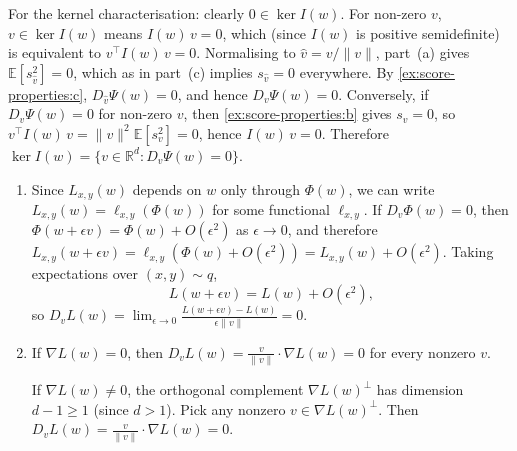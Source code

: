 \documentclass[11pt]{article}
\newcommand{\R}{\mathbb{R}}
\newcommand{\E}{\mathbb{E}}
\begin{document}
\begin{solution}
\begin{enumerate}
        For the kernel characterisation: clearly $0 \in \ker I(w)$.
        For non-zero $v$, $v \in \ker I(w)$ means $I(w)\,v = 0$, which
        (since $I(w)$ is positive semidefinite) is equivalent to
        $v^\top I(w)\, v = 0$. Normalising to $\hat{v} = v/\|v\|$,
        part~(a) gives $\E[s_{\hat{v}}^2] = 0$, which as in part~(c)
        implies $s_{\hat{v}} = 0$ everywhere. By
        \cref{ex:score-properties:c}, $D_{\hat{v}} \Psi(w) = 0$, and
        hence $D_v \Psi(w) = 0$. Conversely, if $D_v \Psi(w) = 0$ for
        non-zero $v$, then \cref{ex:score-properties:b} gives $s_v = 0$,
        so $v^\top I(w)\, v = \|v\|^2 \E[s_v^2] = 0$, hence
        $I(w)\, v = 0$. Therefore
        $\ker I(w)
        = \{v \in \R^d : D_v \Psi(w) = 0\}$. \qedhere
\end{enumerate}
\end{solution}

\begin{solution}
\begin{enumerate}
    \item
        Since $L_{x,y}(w)$ depends on $w$ only through $\Phi(w)$, we can write
        $L_{x,y}(w) = \ell_{x,y}(\Phi(w))$ for some functional $\ell_{x,y}$.
        If $D_v\Phi(w) = 0$, then
            $\Phi(w + \epsilon v) = \Phi(w) + O(\epsilon^2)$
        as $\epsilon \to 0$, and therefore
            $L_{x,y}(w + \epsilon v)
            = \ell_{x,y}(\Phi(w) + O(\epsilon^2))
            = L_{x,y}(w) + O(\epsilon^2)$.
        Taking expectations over $(x,y) \sim q$,
        \begin{equation*}
            L(w + \epsilon v) = L(w) + O(\epsilon^2),
        \end{equation*}
        so $D_v L(w)
        = \lim_{\epsilon \to 0}
            \frac{L(w + \epsilon v) - L(w)}{\epsilon\|v\|}
        = 0$.

    \item
        If $\nabla L(w) = 0$, then $D_v L(w) = \frac{v}{\|v\|} \cdot
        \nabla L(w) = 0$ for every nonzero $v$.

        If $\nabla L(w) \neq 0$, the orthogonal complement
        $\nabla L(w)^\perp$ has dimension $d - 1 \geq 1$ (since $d > 1$).
        Pick any nonzero $v \in \nabla L(w)^\perp$. Then
        $D_v L(w) = \frac{v}{\|v\|} \cdot \nabla L(w) = 0$. \qedhere
\end{enumerate}
\end{solution}
\end{document}
